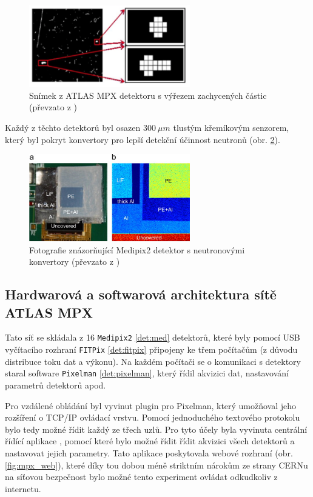 \begin{figure}[ht]
	\begin{center}
		\includegraphics[width=7cm]{figures/mpx_cluster.png}
		\caption{Snímek z ATLAS MPX detektoru s výřezem zachycených částic (převzato z \cite{atlasmpx})}
		\label{fig:mpx_cluster}
	\end{center}
\end{figure}


Každý z těchto detektorů byl osazen $300~\mu m$ tlustým křemíkovým senzorem, který byl pokryt konvertory pro lepší detekční účinnost neutronů (obr. \ref{fig:mpx_lay}).

\begin{figure}[ht]
	\begin{center}
		\includegraphics[width=7cm]{figures/mpx-layers.jpg}
		\caption{Fotografie znázorňující Medipix2 detektor s neutronovými konvertory (převzato z \cite{Vykydal200935})}
		\label{fig:mpx_lay}
	\end{center}
\end{figure}

\subsection{Hardwarová a softwarová architektura sítě ATLAS MPX}
Tato síť se skládala z 16 \texttt{Medipix2} \ref{det:med} detektorů, které byly pomocí USB vyčítacího rozhraní \texttt{FITPix} \ref{det:fitpix} připojeny ke třem počítačům (z důvodu distribuce toku dat a výkonu). Na každém počítači se o komunikaci s detektory staral software \texttt{Pixelman} \ref{det:pixelman}, který řídil akvizici dat, nastavování parametrů detektorů apod. 

Pro vzdálené obládání byl vyvinut plugin pro Pixelman, který umožňoval jeho rozšíření o TCP/IP ovládací vrstvu. Pomocí jednoduchého textového protokolu bylo tedy možné řídit každý ze třech uzlů. Pro tyto účely byla vyvinuta centrální řídící aplikace \cite{Turecek2011S45}, pomocí které bylo možné řídit řídit akvizici všech detektorů a nastavovat jejich parametry. Tato aplikace poskytovala webové rozhraní (obr. \ref{fig:mpx_web}), které díky tou dobou méně 
striktním nárokům ze strany CERNu na síťovou bezpečnost bylo možné tento experiment ovládat odkudkoliv z internetu.

